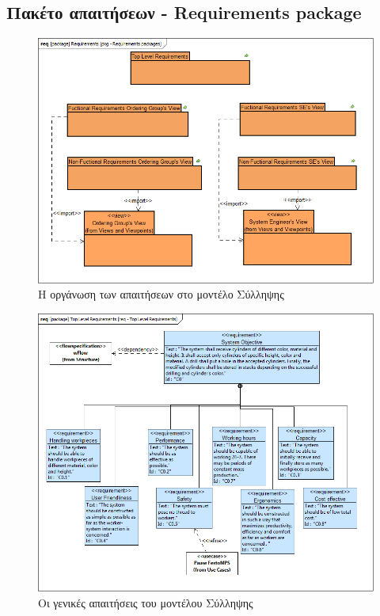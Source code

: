 \documentclass[a4paper,12pt,twoside]{report}
\begin{document}
\begin{appendices}
			\FloatBarrier
			\subsection{Πακέτο απαιτήσεων - Requirements package}
			\clearpage
				\begin{figure}[hp]
					\centering
					\includegraphics[scale=0.45]{ConceptionalModel_pkg-Requirementspackages.png}
					\caption{Η οργάνωση των απαιτήσεων στο μοντέλο Σύλληψης}
					\label{φωτ:Η οργάνωση των απαιτήσεων στο μοντέλο Σύλληψης}
				\end{figure}
				
				\begin{figure}[hp]
					\centering
					\includegraphics[scale=0.45]{ConceptionalModel_req-TopLevelRequirements.png}
					\caption{Οι γενικές απαιτήσεις του μοντέλου Σύλληψης}
					\label{φωτ:Οι γενικές απαιτήσεις του μοντέλου Σύλληψης}
				\end{figure}
				

\end{appendices}
\end{document}
